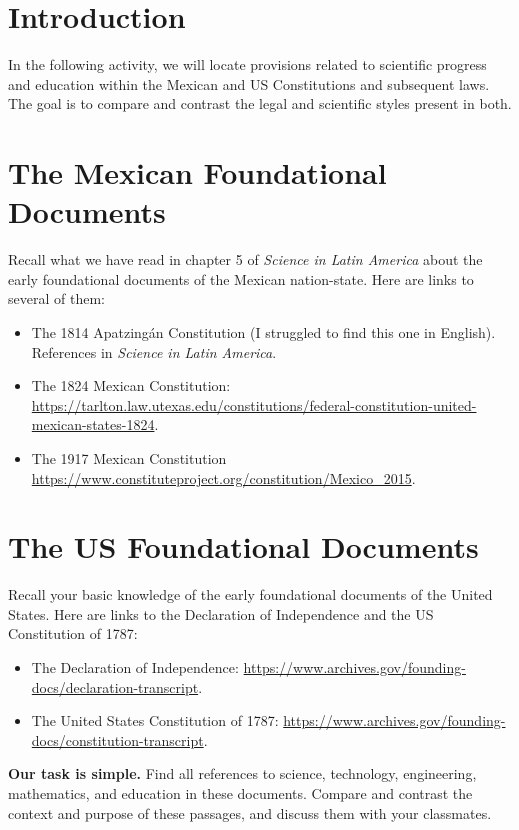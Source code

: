 \documentclass[12pt]{article}
\begin{document}
\maketitle
\small

\section{Introduction}

In the following activity, we will locate provisions related to scientific progress and education within the Mexican and US Constitutions and subsequent laws.  The goal is to compare and contrast the legal and scientific styles present in both.

\section{The Mexican Foundational Documents}

Recall what we have read in chapter 5 of \textit{Science in Latin America} about the early foundational documents of the Mexican nation-state.  Here are links to several of them:
\footnotesize
\begin{itemize}
\item The 1814 Apatzing\'{a}n Constitution (I struggled to find this one in English).  References in \textit{Science in Latin America}.
\item The 1824 Mexican Constitution: \\ \url{https://tarlton.law.utexas.edu/constitutions/federal-constitution-united-mexican-states-1824}.
\item The 1917 Mexican Constitution \\ \url{https://www.constituteproject.org/constitution/Mexico_2015}.
\end{itemize} \vspace{1cm}
\small
\section{The US Foundational Documents}

Recall your basic knowledge of the early foundational documents of the United States.  Here are links to the Declaration of Independence and the US Constitution of 1787:
\footnotesize
\begin{itemize}
\item The Declaration of Independence: \url{https://www.archives.gov/founding-docs/declaration-transcript}.
\item The United States Constitution of 1787: \url{https://www.archives.gov/founding-docs/constitution-transcript}.
\end{itemize} \vspace{1cm}
\small
\textbf{Our task is simple.} Find all references to science, technology, engineering, mathematics, and education in these documents.  Compare and contrast the context and purpose of these passages, and discuss them with your classmates.
\end{document}
